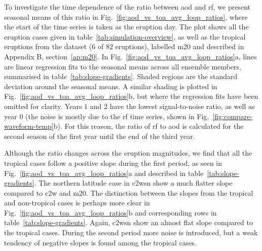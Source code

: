 \documentclass{ametsocV6.1}
\begin{document}
To investigate the time dependence of the ratio between \gls{aod} and \gls{rf}, we present seasonal means of this ratio in Fig.~\ref{fig:aod_vs_toa_avg_loop_ratios},
where the start of the time series is taken as the eruption day. The
plot shows all the eruption cases given in table~\ref{tab:simulation-overview}, as well
as the tropical eruptions from the \citet{marshall2020dataset} dataset (\(6\) of \(82\)
eruptions), labelled \gls{m20} and described in Appendix B, section~\ref{ap:m20}. In
Fig.~\ref{fig:aod_vs_toa_avg_loop_ratios}a, lines are linear regression fits to the
seasonal means across all ensemble members, summarised in
table~\ref{tab:slope-gradients}. Shaded regions are the standard deviation around the
seasonal means. A similar shading is plotted in
Fig.~\ref{fig:aod_vs_toa_avg_loop_ratios}b, but where the regression fits have been
omitted for clarity. Years \(1\) and \(2\) have the lowest signal-to-noise ratio, as
well as year \(0\) (the noise is mostly due to the \gls{rf} time series, shown in
Fig.~\ref{fig:compare-waveform-temp}b). For this reason, the ratio of \gls{rf} to
\gls{aod} is calculated for the second season of the first year until the end of the
third year.

Although the ratio changes across the eruption magnitudes, we find that all the tropical
cases follow a positive slope during the first period, as seen in
Fig.~\ref{fig:aod_vs_toa_avg_loop_ratios}a and described in
table~\ref{tab:slope-gradients}. The northern latitude case in \gls{c2wsn} show a
much flatter slope compared to \gls{c2w} and \gls{m20}. The distinction between the
slopes from the tropical and non-tropical cases is perhaps more clear in
Fig.~\ref{fig:aod_vs_toa_avg_loop_ratios}b and corresponding rows in
table~\ref{tab:slope-gradients}. Again, \gls{c2wsn} show an almost flat slope compared
to the tropical cases. During the second period more noise is introduced, but a weak
tendency of negative slopes is found among the tropical cases.
\end{document}
